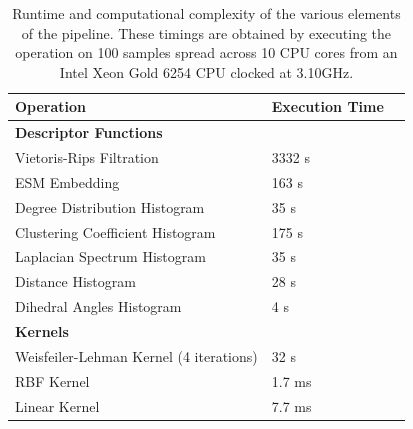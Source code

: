 \begin{table}
  \centering
  \begin{tabular}{lll}
    \toprule
    \textbf{Operation} &  \textbf{Execution Time} \\
    \midrule
    \textbf{Descriptor Functions} & \\
    \midrule
    Vietoris-Rips Filtration & 3332 s \\
    ESM Embedding & 163 s\\
    Degree Distribution Histogram & 35 s\\
    Clustering Coefficient Histogram & 175 s\\
    Laplacian Spectrum Histogram & 35 s\\
    Distance Histogram & 28 s\\
    Dihedral Angles Histogram & 4 s\\
    \midrule
    \textbf{Kernels} & \\
    \midrule
    Weisfeiler-Lehman Kernel (4 iterations) & 32 s \\
    RBF Kernel  & 1.7 ms \\
    Linear Kernel  & 7.7 ms \\
    \bottomrule
  \end{tabular}
  \caption{Runtime and computational complexity of the various elements of the
pipeline. These timings are obtained by executing the operation on 100 samples
spread across 10 CPU cores from an Intel Xeon Gold 6254 CPU clocked at 3.10GHz.}
  \label{tab:runtimes}
\end{table}







